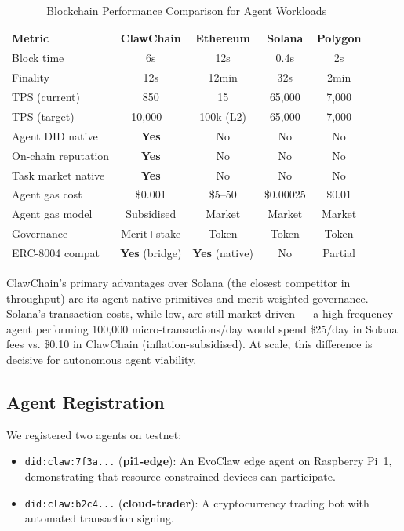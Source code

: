 \documentclass[conference]{IEEEtran}
\begin{document}
\begin{table}[t]
\caption{Blockchain Performance Comparison for Agent Workloads}
\label{tab:chain_compare_full}
\centering
\small
{\setlength{\tabcolsep}{3pt}%
\begin{tabular}{lcccc}
\toprule
\textbf{Metric} & \textbf{ClawChain} & \textbf{Ethereum} & \textbf{Solana} & \textbf{Polygon} \\
\midrule
Block time & 6s & 12s & 0.4s & 2s \\
Finality & 12s & 12min & 32s & 2min \\
TPS (current) & 850 & 15 & 65,000 & 7,000 \\
TPS (target) & 10,000+ & 100k (L2) & 65,000 & 7,000 \\
Agent DID native & \textbf{Yes} & No & No & No \\
On-chain reputation & \textbf{Yes} & No & No & No \\
Task market native & \textbf{Yes} & No & No & No \\
Agent gas cost & \$0.001 & \$5--50 & \$0.00025 & \$0.01 \\
Agent gas model & Subsidised & Market & Market & Market \\
Governance & Merit+stake & Token & Token & Token \\
ERC-8004 compat & \textbf{Yes} (bridge) & \textbf{Yes} (native) & No & Partial \\
\bottomrule
\end{tabular}}
\end{table}

\noindent ClawChain's primary advantages over Solana (the closest competitor in throughput) are its agent-native primitives and merit-weighted governance. Solana's transaction costs, while low, are still market-driven — a high-frequency agent performing 100,000 micro-transactions/day would spend \$25/day in Solana fees vs. \$0.10 in ClawChain (inflation-subsidised). At scale, this difference is decisive for autonomous agent viability.

\subsection{Agent Registration}

We registered two agents on testnet:
\begin{itemize}
    \item \texttt{did:claw:7f3a...} (\textbf{pi1-edge}): An EvoClaw edge agent on Raspberry Pi~1, demonstrating that resource-constrained devices can participate.
    \item \texttt{did:claw:b2c4...} (\textbf{cloud-trader}): A cryptocurrency trading bot with automated transaction signing.
\end{itemize}
\end{document}
